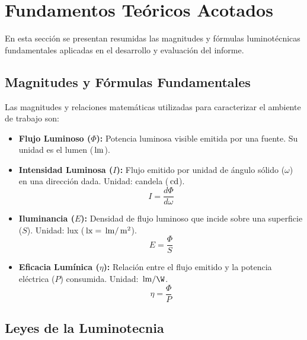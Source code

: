 \chapter{Fundamentos Teóricos Acotados}
\label{sec.tp2:teoria}

En esta sección se presentan resumidas las magnitudes y fórmulas luminotécnicas fundamentales aplicadas en el desarrollo
y evaluación del informe.

\section{Magnitudes y Fórmulas Fundamentales}
\label{sec.tp2:magnitudes}

Las magnitudes y relaciones matemáticas utilizadas para caracterizar el ambiente de trabajo son:

\begin{itemize}
    \item \textbf{Flujo Luminoso ($\Phi$):} Potencia luminosa visible emitida por una fuente. Su unidad es el lumen ($\,\mathrm{lm}$).
    
    \item \textbf{Intensidad Luminosa ($I$):} Flujo emitido por unidad de ángulo sólido ($\omega$) en una dirección dada. Unidad: candela ($\,\mathrm{cd}$).
    \begin{equation}
        I = \frac{d\Phi}{d\omega}
        \label{eq.tp2:intensidad}
    \end{equation}
    
    \item \textbf{Iluminancia ($E$):} Densidad de flujo luminoso que incide sobre una superficie ($S$). Unidad: lux ($\,\mathrm{lx} = \,\mathrm{lm}/\,\mathrm{m}^2$).
    \begin{equation}
        E = \frac{\Phi}{S}
        \label{eq.tp2:iluminancia}
    \end{equation}
    
    \item \textbf{Eficacia Lumínica ($\eta$):} Relación entre el flujo emitido y la potencia eléctrica ($P$) consumida. Unidad: $\lm/\W$.
    \begin{equation}
        \eta = \frac{\Phi}{P}
        \label{eq.tp2:eficacia}
    \end{equation}
\end{itemize}

\section{Leyes de la Luminotecnia}
\label{sec.tp2:leyes}

